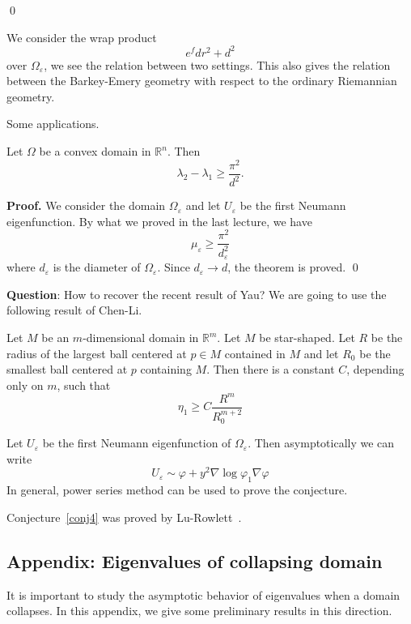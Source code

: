 \qed


\begin{remark}
We consider the wrap product
\[
e^f dr^2 + d^2
\]
over $\Omega_\varepsilon$, we see the relation between two settings. This also
gives the relation between the Barkey-Emery geometry with respect to the
ordinary Riemannian geometry.
\end{remark}

Some applications.
\begin{theorem}
 Let $\Omega$ be a convex domain in $\mathbb{R}^n$. Then
\[
\lambda_2 - \lambda_1 \geqslant \frac{\pi^2}{d^2}.
\]
\end{theorem}
{\bf Proof.}
We consider the domain $\Omega_\varepsilon$ and let $U_\varepsilon$ be the first
Neumann eigenfunction. By what we proved in the last lecture, we have
\[
\mu_\varepsilon \geqslant \frac{\pi^2}{d_\varepsilon^2}
\]
where $d_\varepsilon$ is the diameter of $\Omega_\varepsilon$. Since 
$d_\varepsilon\rightarrow d$, the theorem is proved.
\qed

\textbf{Question}: How to recover the recent result of Yau? We are going to use
the following result of Chen-Li.

\begin{theorem}
Let $M$ be an $m$-dimensional domain in $\mathbb{R}^m$. Let $M$ be star-shaped.
Let $R$ be the radius of the largest ball centered at $p\in M$ contained in $M$
and let $R_0$ be the smallest ball centered at $p$ containing $M$. Then there is
a constant $C$, depending only on $m$, such that
\[
\eta_1 \geqslant C\frac{R^m}{R_0^{m+2}}
\]
\end{theorem}

Let $U_\varepsilon$ be the first Neumann
eigenfunction of $\Omega_\varepsilon$. Then asymptotically we can write
\[
U_\varepsilon \sim \varphi + y^2 \nabla\log \varphi_1 \nabla\varphi
\]
In general, power series method can be used to prove the conjecture.

\begin{remark} Conjecture~\ref{conj4} was proved by Lu-Rowlett~\cite{lu-rowlett}.
\end{remark}

\subsection*{Appendix: Eigenvalues of collapsing domain}

It is important to study the asymptotic behavior of eigenvalues when a domain
collapses. In this appendix, we give some preliminary results in this direction.
\\

